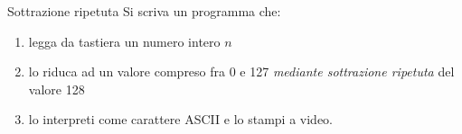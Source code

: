 \documentclass[aspectratio=169]{beamer}
\begin{document}
%
%
%
%
%
%
%
%

\begin{frame}{Sottrazione ripetuta}
Si scriva un programma che:
    \begin{enumerate}
            \item legga da tastiera un numero intero $n$
            \item lo riduca ad un valore compreso fra 0 e 127 \emph{mediante sottrazione ripetuta} del valore 128
            \item lo interpreti come carattere ASCII e lo stampi a video.
    \end{enumerate}
\end{frame}

%
\end{document}
